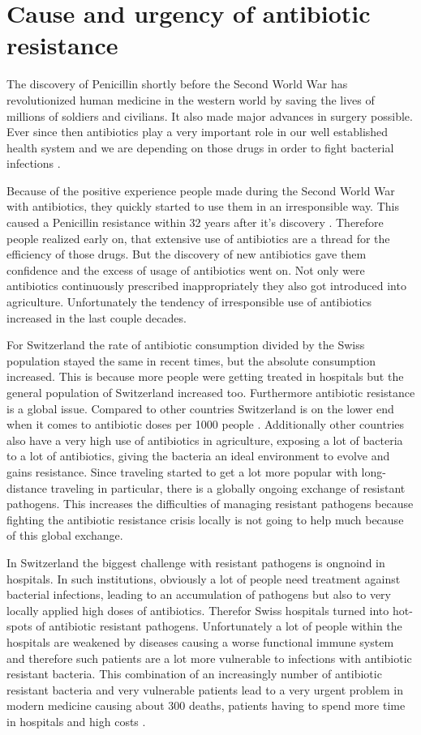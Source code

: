 \section{Cause and urgency of antibiotic resistance}
The discovery of Penicillin shortly before the Second World War has revolutionized human medicine in the western world by saving the lives of millions of soldiers and civilians. It also made major advances in surgery possible. Ever since then antibiotics play a very important role in our well established health system and we are depending on those drugs in order to fight bacterial infections \cite{worldwar_resistance}.

Because of the positive experience people made during the Second World War with antibiotics, they quickly started to use them in an irresponsible way. This caused a Penicillin resistance within 32 years after it's discovery \cite{worldwar_resistance}. Therefore people realized early on, that extensive use of antibiotics are a thread for the efficiency of those drugs. But the discovery of new antibiotics gave them confidence and the excess of usage of antibiotics went on. Not only were antibiotics continuously prescribed inappropriately they also got introduced into agriculture.
Unfortunately the tendency of irresponsible use of antibiotics increased in the last couple decades. 

For Switzerland the rate of antibiotic consumption divided by the Swiss population stayed the same in recent times, but the absolute consumption increased. This is because more people were getting treated in hospitals \cite{swiss_hospitals} but the general population of Switzerland increased too.     
Furthermore antibiotic resistance is a global issue. Compared to other countries Switzerland is on the lower end when it comes to antibiotic doses per 1000 people \cite{swiss_hospitals}. Additionally other countries also have a very high use of antibiotics in agriculture, exposing a lot of bacteria to a lot of antibiotics, giving the bacteria an ideal environment to evolve and gains resistance. Since traveling started to get a lot more popular with long-distance traveling in particular, there is a globally ongoing exchange of resistant pathogens. This increases the difficulties of managing resistant pathogens because fighting the antibiotic resistance crisis locally is not going to help much because of this global exchange.  

In Switzerland the biggest challenge with resistant pathogens is ongnoind in hospitals. In such institutions, obviously a lot of people need treatment against bacterial infections, leading to an accumulation of pathogens but also to very locally applied high doses of antibiotics.
Therefor Swiss hospitals turned into hot-spots of antibiotic resistant pathogens.
Unfortunately a lot of people within the hospitals are weakened by diseases causing a worse functional immune system and therefore such patients are a lot more vulnerable to infections with antibiotic resistant bacteria.
This combination of an increasingly number of antibiotic resistant bacteria and very vulnerable patients lead to a very urgent problem in modern medicine causing about 300 deaths, patients having to spend more time in hospitals and high costs \cite{anresis}.

